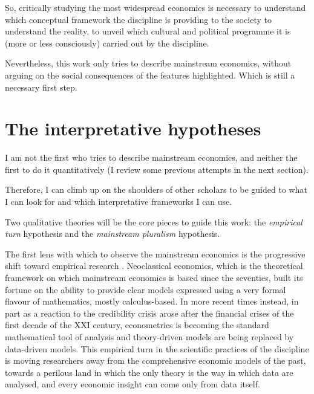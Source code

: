\documentclass[a4paper, 11pt, headings=standardclasses, tablecaptionsbelow]{scrartcl}
\begin{document}
So, critically studying the most widespread economics is necessary to understand which conceptual framework the discipline is providing to the society to understand the reality, to unveil which cultural and political programme it is (more or less consciously) carried out by the discipline.

Nevertheless, this work only tries to describe mainstream economics, without arguing on the social consequences of the features highlighted. Which is still a necessary first step.

\section{The interpretative hypotheses}
I am not the first who tries to describe mainstream economics, and neither the first to do it quantitatively (I review some previous attempts in the next section).

Therefore, I can climb up on the shoulders of other scholars to be guided to what I can look for and which interpretative frameworks I can use.

Two qualitative theories will be the core pieces to guide this work: the \textit{empirical turn} hypothesis and the \textit{mainstream pluralism} hypothesis.

The first lens with which to observe the mainstream economics is the progressive shift toward empirical research \parencite{backhouse2000,backhouse2016,backhouse2017,cherrier2018a}.
Neoclassical economics, which is the theoretical framework on which mainstream economics is based since the seventies, built its fortune on the ability to provide clear models expressed using a very formal flavour of mathematics, mostly calculus-based.
In more recent times instead, in part as a reaction to the credibility crisis arose after the financial crises of the first decade of the XXI century, econometrics is becoming the standard mathematical tool of analysis and theory-driven models are being replaced by data-driven models.
This empirical turn in the scientific practices of the discipline is moving researchers away from the comprehensive economic models of the past, towards a perilous land in which the only theory is the way in which data are analysed, and every economic insight can come only from data itself.
\end{document}

